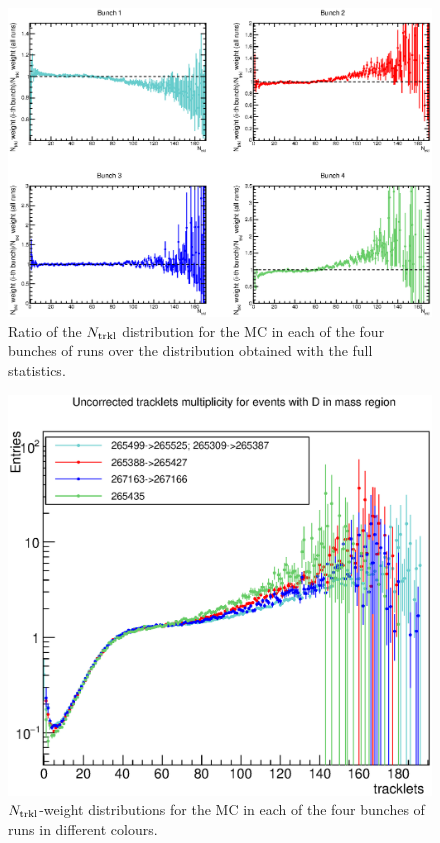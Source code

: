 \begin{figure}[h]
\centering
 \includegraphics[width=.9\textwidth]{FigCap6/NtrkDistrMC_17d2a_EvWithD_zVxtUnCorr_896_897.eps}
 \caption{Ratio of the $N_{\rm trkl}$ distribution for the MC in each of the four bunches of runs over the distribution obtained with the full statistics.}
 \label{fig:RatioNtrklMC}
\end{figure}

\begin{figure}[h]
\centering
 \includegraphics[width=.55\textwidth]{FigCap6/NtrklWeights4Bunches.eps}
 \caption{$N_{\rm trkl}$-weight distributions for the MC in each of the four bunches of runs in different colours.}
 \label{fig:MCweights}
\end{figure}

